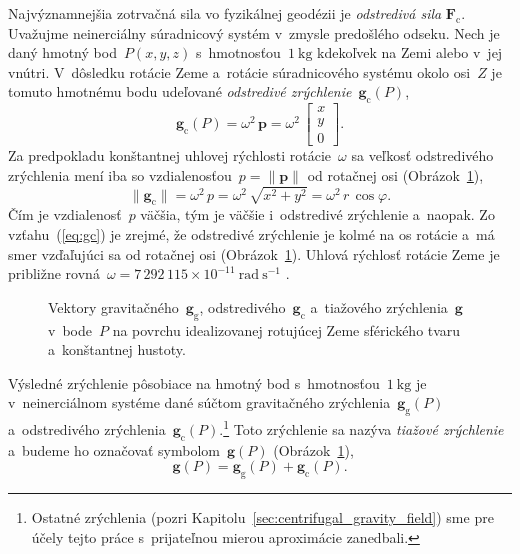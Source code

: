 \documentclass[a4paper, 12pt]{book}
\newcommand{\gidx}{\mathrm g}
\newcommand{\cidx}{\mathrm c}
\let\vec\mathbf
\begin{document}
Najvýznamnejšia zotrvačná sila vo fyzikálnej geodézii je \emph{odstredivá sila}
$\vec F_\cidx$.  Uvažujme neinerciálny súradnicový systém v~zmysle predošlého
odseku.  Nech je daný hmotný bod~$P(x, y, z)$ s~hmotnosťou~$1\ \mathrm{kg}$ 
kdekoľvek na Zemi alebo v~jej vnútri.  V~dôsledku rotácie Zeme a~rotácie 
súradnicového systému okolo osi~$Z$ je tomuto hmotnému bodu udeľované 
\emph{odstredivé zrýchlenie}~$\vec g_\cidx(P)$,
%
\begin{equation}
\label{eq:gc}
\vec g_\cidx(P) = \omega^2 \, \vec p =
%
\omega^2 \, \begin{bmatrix}
x\\
y\\
0
\end{bmatrix}
%
{.}
\end{equation}
%
Za predpokladu konštantnej uhlovej rýchlosti rotácie~$\omega$ sa veľkosť
odstredivého zrýchlenia mení iba so vzdialenosťou~$p = \| \vec p \|$ od 
rotačnej osi (Obrázok~\ref{fig:gravity_vector}),
%
\begin{equation}
\| \vec g_\cidx \| = \omega^2 \, p = \omega^2 \, \sqrt{x^2 + y^2} = \omega^2 \, 
r \, \cos\varphi{.}
\end{equation}
%
Čím je vzdialenosť~$p$ väčšia, tým je väčšie i~odstredivé zrýchlenie a~naopak.
Zo vzťahu~(\ref{eq:gc}) je zrejmé, že odstredivé zrýchlenie je kolmé na os
rotácie a~má smer vzďaľujúci sa od rotačnej osi
(Obrázok~\ref{fig:gravity_vector}).  Uhlová rýchlosť rotácie Zeme je približne
rovná~$\omega = 7\, 292\, 115 \times 10^{-11} \ \mathrm{rad} \ \mathrm{s}^{-1}$ 
\parencite{GRS80}{.}

\begin{figure}
\centering

\caption{Vektory gravitačného~$\vec g_\gidx$, odstredivého~$\vec g_\cidx$
a~tiažového zrýchlenia~$\vec g$ v~bode~$P$ na povrchu idealizovanej rotujúcej
Zeme sférického tvaru a~konštantnej hustoty.}
\label{fig:gravity_vector}
\end{figure}

Výsledné zrýchlenie pôsobiace na hmotný bod s~hmotnosťou~$1 \ \mathrm{kg}$ je
v~neinerciálnom systéme dané súčtom gravitačného zrýchlenia~$\vec g_\gidx(P)$
a~odstredivého zrýchlenia~$\vec g_\cidx(P)$.\footnote{Ostatné zrýchlenia (pozri
Kapitolu~\ref{sec:centrifugal_gravity_field}) sme pre účely tejto práce 
s~prijateľnou mierou aproximácie zanedbali.}  Toto zrýchlenie sa nazýva 
\emph{tiažové zrýchlenie} a~budeme ho označovať symbolom~$\vec g(P)$ 
(Obrázok~\ref{fig:gravity_vector}),
%
\begin{equation}
\label{eq:g}
\vec g(P) = \vec g_\gidx(P) + \vec g_\cidx(P){.}
\end{equation}
\end{document}
